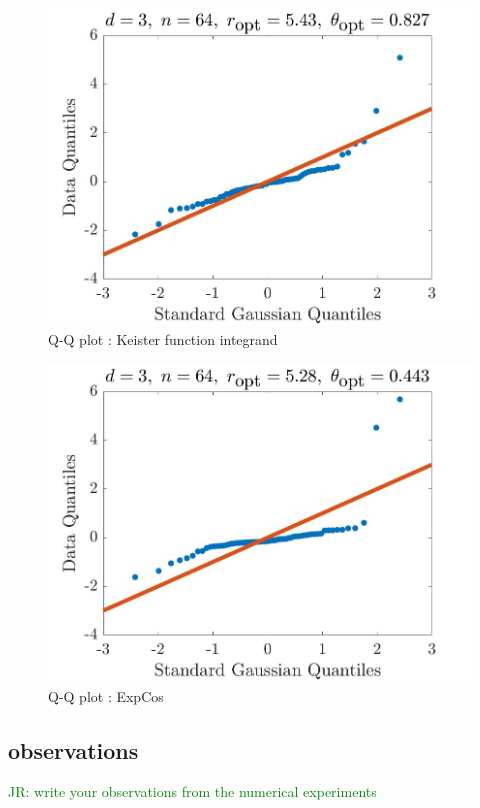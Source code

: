 \documentclass{svjour3}                     %
\newcommand{\JRNote}[1]{{\textcolor{green}{JR: #1}}}
\begin{document}
\begin{figure}[ht]
	\centering
	\includegraphics[width=0.9\linewidth]{"figures/Keister-QQPlot-n-64-d-3-1"}
	\caption{Q-Q plot : Keister function integrand}
	\label{fig:keister-normplot}
\end{figure}

\begin{figure}[ht]
	\centering
	\includegraphics[width=0.9\linewidth]{"figures/ExpCos-QQPlot-n-64-d-3-1"}
	\caption{Q-Q plot : ExpCos}
	\label{fig:expcos-normplot}
\end{figure}




\subsection{observations}
\JRNote{write your observations from the numerical experiments}
\end{document}
